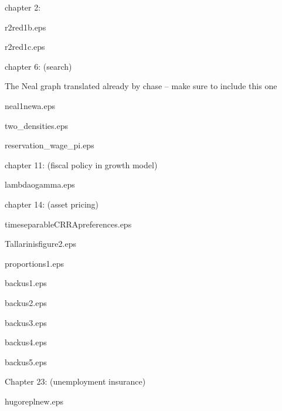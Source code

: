 chapter 2:

   r2red1b.eps
   
   r2red1c.eps
   
chapter 6: (search)

   The Neal graph translated already by chase -- make sure to include this one

   neal1newa.eps

   two_densities.eps
   
   reservation_wage_pi.eps
   
chapter 11: (fiscal policy in growth model)

   lambdaogamma.eps
   
chapter 14: (asset pricing)

   timeseparableCRRApreferences.eps
   
   Tallarinisfigure2.eps
   
   proportions1.eps
   
   backus1.eps
   
   backus2.eps
   
   backus3.eps
   
   backus4.eps
   
   backus5.eps 
   
 Chapter 23: (unemployment insurance)
 
    hugoreplnew.eps        